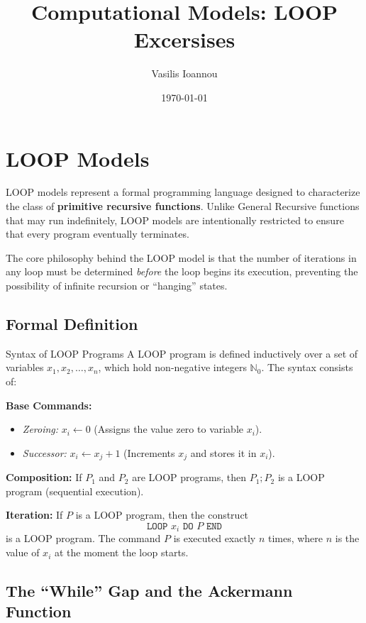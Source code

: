 \documentclass[11pt,a4paper]{article}
\title{Computational Models: LOOP Excersises}
\author{Vasilis Ioannou}
\date{\today}
\begin{document}
\maketitle

\section*{LOOP Models}

LOOP models represent a formal programming language designed to characterize the class of \textbf{primitive recursive functions}. Unlike General Recursive functions that may run indefinitely, LOOP models are intentionally restricted to ensure that every program eventually terminates. 

The core philosophy behind the LOOP model is that the number of iterations in any loop must be determined \textit{before} the loop begins its execution, preventing the possibility of infinite recursion or ``hanging'' states.

\subsection*{Formal Definition}

\begin{mybox}{Syntax of LOOP Programs}
A LOOP program is defined inductively over a set of variables $x_1, x_2, \dots, x_n$, which hold non-negative integers $\mathbb{N}_0$. The syntax consists of:
    \item \textbf{Base Commands:}
    \begin{itemize}
        \item \textit{Zeroing:} $x_i \leftarrow 0$ (Assigns the value zero to variable $x_i$).
        \item \textit{Successor:} $x_i \leftarrow x_j + 1$ (Increments $x_j$ and stores it in $x_i$).
    \end{itemize}
    \item \textbf{Composition:} If $P_1$ and $P_2$ are LOOP programs, then $P_1; P_2$ is a LOOP program (sequential execution).
    \item \textbf{Iteration:} If $P$ is a LOOP program, then the construct 
    \[ \texttt{LOOP } x_i \texttt{ DO } P \texttt{ END} \]
    is a LOOP program. The command $P$ is executed exactly $n$ times, where $n$ is the value of $x_i$ at the moment the loop starts. 
\end{mybox}

\subsection*{The ``While'' Gap and the Ackermann Function}
\end{document}
